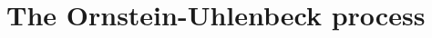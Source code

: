 \documentclass{beamer}
\begin{document}
% 
% 
 


\section{The Ornstein-Uhlenbeck process}
\end{document}
